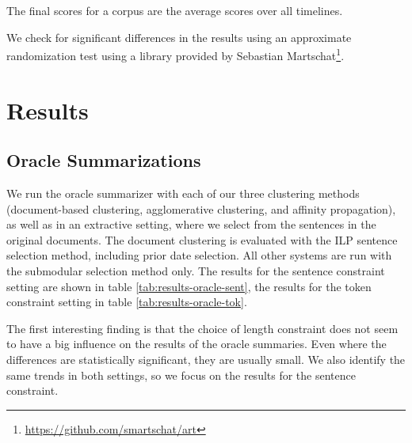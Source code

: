 \documentclass[a4paper,BCOR=10mm]{report}
\numberwithin{lemma}{chapter}
\numberwithin{definition}{chapter}
\begin{document}
The final scores for a corpus are the average scores over all timelines.

We check for significant differences in the results using an approximate randomization test \citep{art} using a library provided by Sebastian Martschat\footnote{\url{https://github.com/smartschat/art}}. %

\section{Results}

\subsection{Oracle Summarizations}

We run the oracle summarizer with each of our three clustering methods (document-based clustering, agglomerative clustering, and affinity propagation), as well as in an extractive setting, where we select from the sentences in the original documents.
The document clustering is evaluated with the ILP sentence selection method, including prior date selection. %
All other systems are run with the submodular selection method only.
The results for the sentence constraint setting are shown in table \ref{tab:results-oracle-sent}, the results for the token constraint setting in table \ref{tab:results-oracle-tok}.

The first interesting finding is that the choice of length constraint does not seem to have a big influence on the results of the oracle summaries. Even where the differences are statistically significant, they are usually small.
We also identify the same trends in both settings, so we focus on the results for the sentence constraint.
\end{document}
